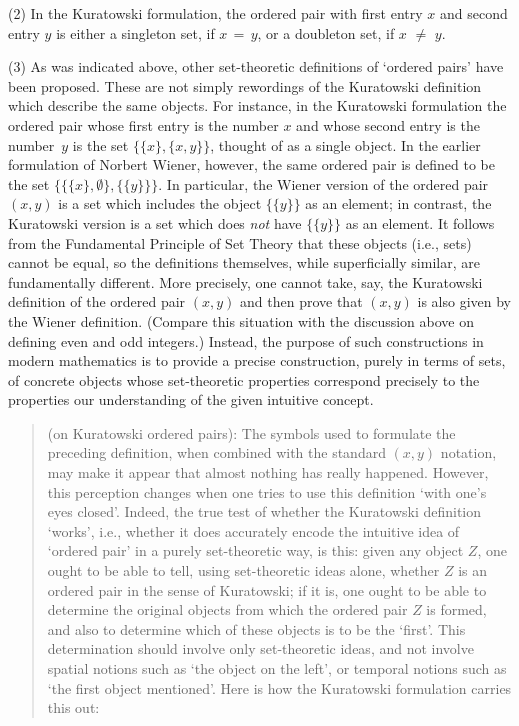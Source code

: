 {\V

        (2) In the Kuratowski formulation, the ordered pair with first entry $x$ and second entry $y$ is either a singleton set, if $x \,=\, y$, or a doubleton set, if $x \,\,{\neq}\,\, y$.

\V

        (3) As was indicated above, other set-theoretic definitions of `ordered pairs' have been proposed.
    These are not simply rewordings of the Kuratowski definition which describe the same objects.
    For instance, in the Kuratowski formulation the ordered pair whose first entry is the number $x$
    and whose second entry is the number~$y$ is the set $\{\{x\}, \{x,y\}\}$, thought of as a single object.
    In the earlier formulation of Norbert Wiener, however, the same ordered pair is defined to be the set $\{\{\{x\},{\emptyset}\}, \{\{y\}\}\}$.
    In particular, the Wiener version of the ordered pair $(x,y)$ is a set which includes the object $\{\{y\}\}$ as an element;
    in contrast, the Kuratowski version is a set which does {\em not} have $\{\{y\}\}$ as an element.
    It follows from the Fundamental Principle of Set Theory that these objects (i.e., sets) cannot be equal,
    so the definitions themselves, while superficially similar, are fundamentally different.
    More precisely, one cannot take, say, the Kuratowski definition of the ordered pair $(x,y)$
    and then prove that $(x,y)$ is also given by the Wiener definition.
    (Compare this situation with the discussion above on defining even and odd integers.)
    Instead, the purpose of such constructions in modern mathematics is to provide a precise construction, purely in terms of sets,
    of concrete objects whose set-theoretic properties correspond precisely to the properties our understanding of the given intuitive concept.

\V
\V

\begin{quotation}
{\footnotesize \underline{\Note} (on Kuratowski ordered pairs):
    The symbols used to formulate the preceding definition, when combined with the standard $(x,y)$ notation,
    may make it appear that almost nothing has really happened. However, this perception changes when one tries to use this definition `with one's eyes closed'.
    Indeed, the true test of whether the Kuratowski definition `works', i.e., whether it does accurately encode the intuitive idea of `ordered pair'
    in a purely set-theoretic way, is this: given any object $Z$, one ought to be able to tell,
    using set-theoretic ideas alone, whether $Z$ is an ordered pair in the sense of Kuratowski;
    if it is, one ought to be able to determine the original objects from which the ordered pair $Z$ is formed,
    and also to determine which of these objects is to be the `first'.
    This determination should involve only set-theoretic ideas, and not involve spatial notions such as `the object on the left',
    or temporal notions such as `the first object mentioned'. Here is how the Kuratowski formulation carries this out:

}
\end{quotation}}

